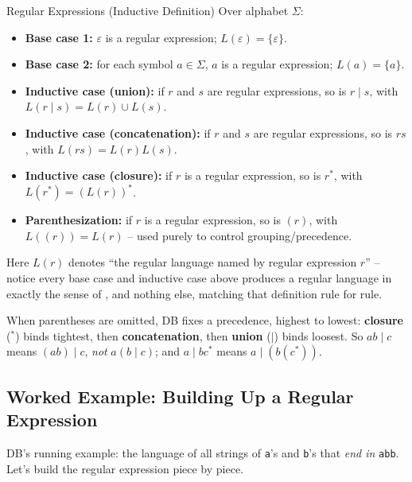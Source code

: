\documentclass[full-course-notes.tex]{subfiles}
\begin{document}
\begin{defbox}{Regular Expressions (Inductive Definition)}
Over alphabet $\Sigma$:
\begin{itemize}
  \item \textbf{Base case 1:} $\varepsilon$ is a regular expression; $L(\varepsilon) = \{\varepsilon\}$.
  \item \textbf{Base case 2:} for each symbol $a \in \Sigma$, $a$ is a regular expression;
  $L(a) = \{a\}$.
  \item \textbf{Inductive case (union):} if $r$ and $s$ are regular expressions, so is
  $r \mid s$, with $L(r \mid s) = L(r) \cup L(s)$.
  \item \textbf{Inductive case (concatenation):} if $r$ and $s$ are regular expressions, so is
  $rs$, with $L(rs) = L(r)L(s)$.
  \item \textbf{Inductive case (closure):} if $r$ is a regular expression, so is $r^{*}$, with
  $L(r^{*}) = (L(r))^{*}$.
  \item \textbf{Parenthesization:} if $r$ is a regular expression, so is $(r)$, with
  $L((r)) = L(r)$ -- used purely to control grouping/precedence.
\end{itemize}
Here $L(r)$ denotes ``the regular language named by regular expression $r$'' -- notice every
base case and inductive case above produces a regular language in exactly the sense of
, and nothing else, matching that definition rule for
rule.
\end{defbox}

\begin{coreidea}
When parentheses are omitted, DB fixes a precedence, highest to lowest: \textbf{closure}
($^{*}$) binds tightest, then \textbf{concatenation}, then \textbf{union} ($\mid$) binds
loosest. So $ab \mid c$ means $(ab)\mid c$, \emph{not} $a(b\mid c)$; and $a\mid bc^{*}$ means
$a \mid (b(c^{*}))$.
\end{coreidea}

\subsection{Worked Example: Building Up a Regular Expression}
\label{sec:l4-worked-example-build-up}

DB's running example: the language of all strings of \texttt{a}'s and \texttt{b}'s that
\emph{end in} \texttt{abb}. Let's build the regular expression piece by piece.
\end{document}
